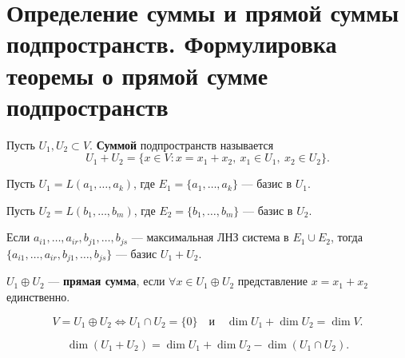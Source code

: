 \section{Определение суммы и прямой суммы подпространств. Формулировка теоремы о прямой сумме подпространств}

\begin{definition}
Пусть $U_1, U_2 \subset V$. \textbf{Суммой} подпространств называется
\[
U_1 + U_2 = \{ x \in V : x = x_1 + x_2,\ x_1 \in U_1,\ x_2 \in U_2 \}.
\]

Пусть $U_1 = L(a_1, \ldots, a_k)$, где $E_1 = \{a_1, \ldots, a_k\}$ --- базис в $U_1$.

Пусть $U_2 = L(b_1, \ldots, b_m)$, где $E_2 = \{b_1, \ldots, b_m\}$ --- базис в $U_2$.

Если $a_{i1}, \ldots, a_{ir}, b_{j1}, \ldots, b_{js}$ --- максимальная ЛНЗ система в $E_1 \cup E_2$, тогда $\{a_{i1}, \ldots, a_{ir}, b_{j1}, \ldots, b_{js}\}$ --- базис $U_1 + U_2$.
\end{definition}

\begin{definition}
$U_1 \oplus U_2$ --- \textbf{прямая сумма}, если $\forall x \in U_1 \oplus U_2$ представление $x = x_1 + x_2$ единственно.
\end{definition}

\begin{theorem}
\[
V = U_1 \oplus U_2 \iff U_1 \cap U_2 = \{0\} \quad \text{и} \quad \dim U_1 + \dim U_2 = \dim V.
\]
\end{theorem}

\begin{corollary}
\[
\dim(U_1 + U_2) = \dim U_1 + \dim U_2 - \dim(U_1 \cap U_2).
\]
\end{corollary}
